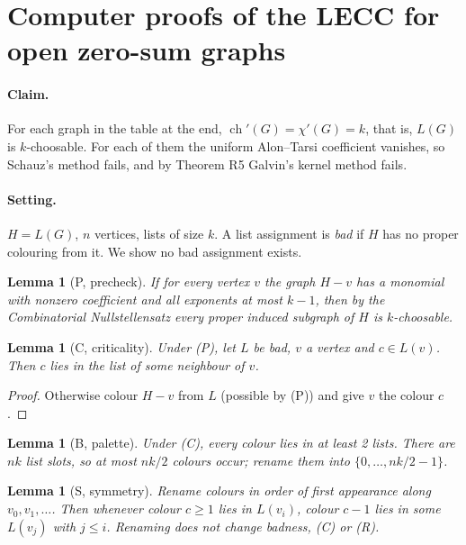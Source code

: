 \documentclass[11pt]{article}
\theoremstyle{plain}
\newtheorem{lemma}[theorem]{Lemma}
\theoremstyle{definition}
\newcommand{\ch}{\operatorname{ch}}
\begin{document}
\section{Computer proofs of the LECC for open zero-sum graphs}

\paragraph{Claim.} For each graph in the table at the end, $\ch'(G) = \chi'(G) = k$, that is,
$L(G)$ is $k$-choosable. For each of them the uniform Alon--Tarsi coefficient vanishes, so
Schauz's method fails, and by Theorem R5 Galvin's kernel method fails.

\paragraph{Setting.} $H = L(G)$, $n$ vertices, lists of size $k$. A list assignment is
\emph{bad} if $H$ has no proper colouring from it. We show no bad assignment exists.

\begin{lemma}[P, precheck]
If for every vertex $v$ the graph $H - v$ has a monomial with nonzero coefficient and all
exponents at most $k-1$, then by the Combinatorial Nullstellensatz every proper induced
subgraph of $H$ is $k$-choosable.
\end{lemma}

\begin{lemma}[C, criticality]
Under (P), let $L$ be bad, $v$ a vertex and $c \in L(v)$. Then $c$ lies in the list of some
neighbour of $v$.
\end{lemma}
\begin{proof}
Otherwise colour $H - v$ from $L$ (possible by (P)) and give $v$ the colour $c$.
\end{proof}

\begin{lemma}[B, palette]
Under (C), every colour lies in at least 2 lists. There are $nk$ list slots, so at most $nk/2$
colours occur; rename them into $\{0, \dots, nk/2 - 1\}$.
\end{lemma}

\begin{lemma}[S, symmetry]
Rename colours in order of first appearance along $v_0, v_1, \dots$. Then whenever colour
$c \ge 1$ lies in $L(v_i)$, colour $c-1$ lies in some $L(v_j)$ with $j \le i$. Renaming does not
change badness, (C) or (R).
\end{lemma}
\end{document}
